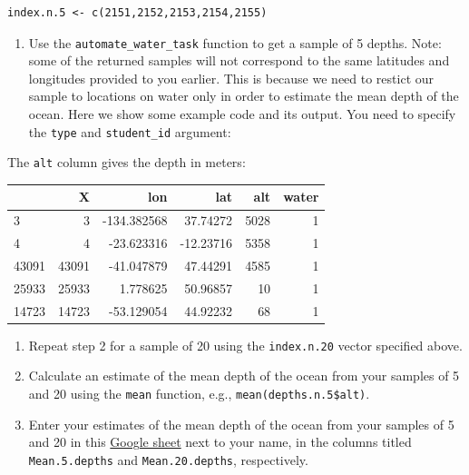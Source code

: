 \documentclass[letterpaper,12pt,twoside,]{pinp}
\providecommand{\tightlist}{%
  \setlength{\itemsep}{0pt}\setlength{\parskip}{0pt}}
\begin{document}
\begin{ShadedResult}
\begin{verbatim}
index.n.5 <- c(2151,2152,2153,2154,2155)
\end{verbatim}
\end{ShadedResult}

\begin{enumerate}
\def\labelenumi{\arabic{enumi}.}
\setcounter{enumi}{1}
\tightlist
\item
  Use the \texttt{automate\_water\_task} function to get a sample of 5
  depths. Note: some of the returned samples will not correspond to the
  same latitudes and longitudes provided to you earlier. This is because
  we need to restict our sample to locations on water only in order to
  estimate the mean depth of the ocean. Here we show some example code
  and its output. You need to specify the \texttt{type} and
  \texttt{student\_id} argument:
\end{enumerate}

\begin{Shaded}
\begin{Highlighting}[]
\NormalTok{ <-}\StringTok{ }\NormalTok{(}\NormalTok{, } \NormalTok{, } \NormalTok{)}
\end{Highlighting}
\end{Shaded}

\newpage

The \texttt{alt} column gives the depth in meters:

\begin{longtable}[]{@{}lrrrrr@{}}
\toprule
& X & lon & lat & alt & water\tabularnewline
\midrule
\endhead
3 & 3 & -134.382568 & 37.74272 & 5028 & 1\tabularnewline
4 & 4 & -23.623316 & -12.23716 & 5358 & 1\tabularnewline
43091 & 43091 & -41.047879 & 47.44291 & 4585 & 1\tabularnewline
25933 & 25933 & 1.778625 & 50.96857 & 10 & 1\tabularnewline
14723 & 14723 & -53.129054 & 44.92232 & 68 & 1\tabularnewline
\bottomrule
\end{longtable}

\begin{enumerate}
\def\labelenumi{\arabic{enumi}.}
\setcounter{enumi}{2}
\item
  Repeat step 2 for a sample of 20 using the \texttt{index.n.20} vector
  specified above.
\item
  Calculate an estimate of the mean depth of the ocean from your samples
  of 5 and 20 using the \texttt{mean} function, e.g.,
  \texttt{mean(depths.n.5\$alt)}.
\item
  Enter your estimates of the mean depth of the ocean from your samples
  of 5 and 20 in this
  \href{https://docs.google.com/spreadsheets/d/1Mnxeq9nQcTdQycZ7S_62fYFiNC5_a3fibsyodzfwO58/edit?usp=sharing}{Google
  sheet} next to your name, in the columns titled \texttt{Mean.5.depths}
  and \texttt{Mean.20.depths}, respectively.
\end{enumerate}
\end{document}
